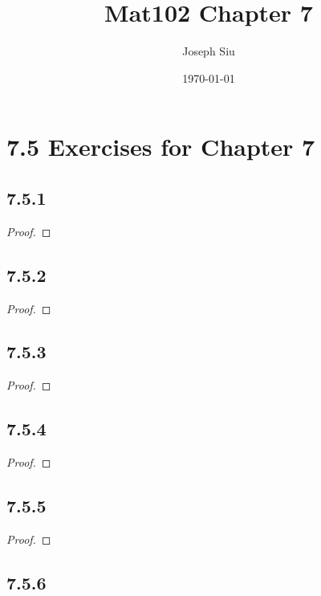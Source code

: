 \documentclass{article}
\title{Mat102 Chapter 7}
\author{Joseph Siu}
\date{\today}
\begin{document}
\maketitle

\section*{7.5 Exercises for Chapter 7 }

\subsection*{7.5.1}

\begin{proof}

\end{proof}

\subsection*{7.5.2}

\begin{proof}

\end{proof}

\subsection*{7.5.3}

\begin{proof}

\end{proof}

\subsection*{7.5.4}

\begin{proof}

\end{proof}

\subsection*{7.5.5}

\begin{proof}

\end{proof}

\subsection*{7.5.6}
\end{document}
